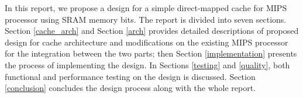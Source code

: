 \documentclass[conference]{IEEEtran}
\begin{document}
In this report, we propose a design for a simple direct-mapped cache for MIPS processor using SRAM memory bits. The report is divided into seven sections. Section \ref{cache_arch} and Section \ref{arch} provides detailed descriptions of proposed design for cache architecture and modifications on the existing MIPS processor for the integration between the two parts; then Section \ref{implementation} presents the process of implementing the design. In Sections \ref{testing} and \ref{quality}, both functional and performance testing on the design is discussed. Section \ref{conclusion} concludes the design process along with the whole report.

%


% 

%
%



%
%
\end{document}

